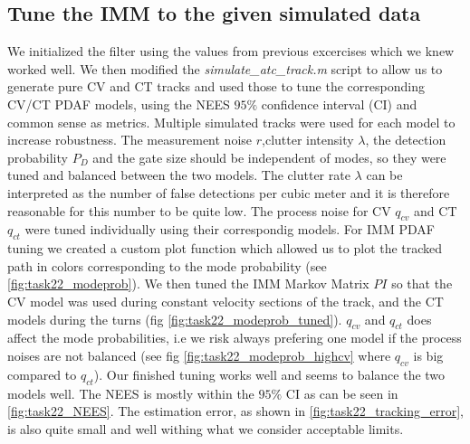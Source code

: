 \subsection{Tune the IMM to the given simulated data}

We initialized the filter using the values from previous excercises which we knew worked well. We then modified the \textit{simulate\_atc\_track.m} script to allow us to generate pure CV and CT tracks and used those to tune the corresponding CV/CT PDAF models, using the NEES $95 \%$ confidence interval (CI) and common sense as metrics. Multiple simulated tracks were used for each model to increase robustness. The measurement noise $r$,clutter intensity $\lambda$, the detection probability $P_D$ and the gate size should be independent of modes, so they were tuned and balanced between the two models. The clutter rate $\lambda$ can be interpreted as the number of false detections per cubic meter and it is therefore reasonable for this number to be quite low. The process noise for CV $q_{cv}$ and CT $q_{ct}$ were tuned individually using their correspondig models. For IMM PDAF tuning we created a custom plot function which allowed us to plot the tracked path in colors corresponding to the mode probability (see \cref{fig:task22_modeprob}). We then tuned the IMM Markov Matrix $PI$ so that the CV model was used during constant velocity sections of the track, and the CT models during the turns (fig \ref{fig:task22_modeprob_tuned}). $q_{cv}$ and $q_{ct}$ does affect the mode probabilities, i.e we risk always prefering one model if the process noises are not balanced (see fig \ref{fig:task22_modeprob_highcv} where $q_{cv}$ is big compared to $q_{ct}$). Our finished tuning works well and seems to balance the two models well. The NEES is mostly within the $95\%$ CI as can be seen in \cref{fig:task22_NEES}. The estimation error, as shown in \cref{fig:task22_tracking_error}, is also quite small and well withing what we consider acceptable limits.

